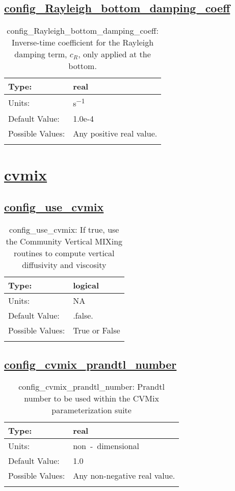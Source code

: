 \subsection[config\_Rayleigh\_bottom\_damping\_coeff]{\hyperref[sec:nm_tab_Rayleigh_damping]{config\_Rayleigh\_bottom\_damping\_coeff}}
\label{subsec:nm_sec_config_Rayleigh_bottom_damping_coeff}
\begin{center}
\begin{longtable}{| p{2.0in} || p{4.0in} |}
    \hline
    Type: & real \\
    \hline
    Units: & \si{s^{-1}} \\
    \hline
    Default Value: & 1.0e-4 \\
    \hline
    Possible Values: & Any positive real value. \\
    \hline
    \caption{config\_Rayleigh\_bottom\_damping\_coeff: Inverse-time coefficient for the Rayleigh damping term, $c_R$, only applied at the bottom.}
\end{longtable}
\end{center}
\section[cvmix]{\hyperref[sec:nm_tab_cvmix]{cvmix}}
\label{sec:nm_sec_cvmix}
\subsection[config\_use\_cvmix]{\hyperref[sec:nm_tab_cvmix]{config\_use\_cvmix}}
\label{subsec:nm_sec_config_use_cvmix}
\begin{center}
\begin{longtable}{| p{2.0in} || p{4.0in} |}
    \hline
    Type: & logical \\
    \hline
    Units: & \si{NA} \\
    \hline
    Default Value: & .false. \\
    \hline
    Possible Values: & True or False \\
    \hline
    \caption{config\_use\_cvmix: If true, use the Community Vertical MIXing routines to compute vertical diffusivity and viscosity}
\end{longtable}
\end{center}
\subsection[config\_cvmix\_prandtl\_number]{\hyperref[sec:nm_tab_cvmix]{config\_cvmix\_prandtl\_number}}
\label{subsec:nm_sec_config_cvmix_prandtl_number}
\begin{center}
\begin{longtable}{| p{2.0in} || p{4.0in} |}
    \hline
    Type: & real \\
    \hline
    Units: & \si{non-dimensional} \\
    \hline
    Default Value: & 1.0 \\
    \hline
    Possible Values: & Any non-negative real value. \\
    \hline
    \caption{config\_cvmix\_prandtl\_number: Prandtl number to be used within the CVMix parameterization suite}
\end{longtable}
\end{center}
